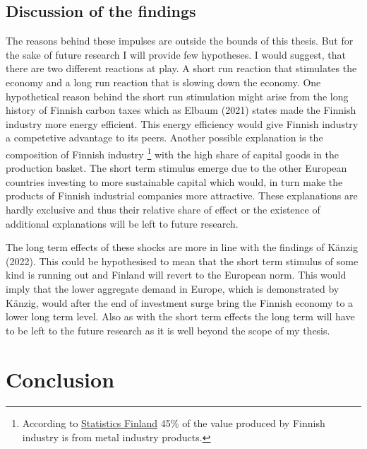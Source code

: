 \documentclass[
  12pt,
  a4paper,
]{report}
\begin{document}
\hypertarget{discussion-of-the-findings}{%
\section{Discussion of the findings}\label{discussion-of-the-findings}}

The reasons behind these impulses are outside the bounds of this thesis. But for the sake of future research I will provide few hypotheses. I would suggest, that there are two different reactions at play. A short run reaction that stimulates the economy and a long run reaction that is slowing down the economy. One hypothetical reason behind the short run stimulation might arise from the long history of Finnish carbon taxes which as Elbaum (2021) states made the Finnish industry more energy efficient. This energy efficiency would give Finnish industry a competetive advantage to its peers. Another possible explanation is the composition of Finnish industry \footnote{According to \href{https://www.stat.fi/til/tti/2020/tti_2020_2021-07-01_tie_001_en.html}{Statistics Finland} 45\% of the value produced by Finnish industry is from metal industry products.} with the high share of capital goods in the production basket. The short term stimulus emerge due to the other European countries investing to more sustainable capital which would, in turn make the products of Finnish industrial companies more attractive. These explanations are hardly exclusive and thus their relative share of effect or the existence of additional explanations will be left to future research.

The long term effects of these shocks are more in line with the findings of Känzig (2022). This could be hypothesised to mean that the short term stimulus of some kind is running out and Finland will revert to the European norm. This would imply that the lower aggregate demand in Europe, which is demonstrated by Känzig, would after the end of investment surge bring the Finnish economy to a lower long term level. Also as with the short term effects the long term will have to be left to the future research as it is well beyond the scope of my thesis.

\hypertarget{conclusion}{%
\chapter{Conclusion}\label{conclusion}}

  
\end{document}

